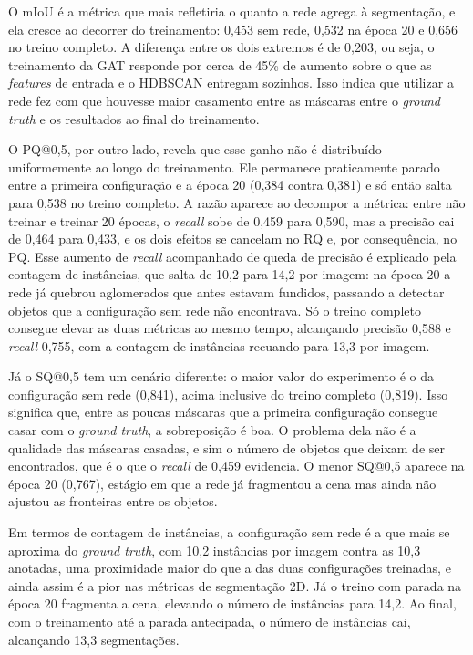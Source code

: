 O mIoU é a métrica que mais refletiria o quanto a rede agrega à segmentação, e ela cresce ao decorrer do treinamento: 0,453 sem rede, 0,532 na época 20 e 0,656 no treino completo. A diferença entre os dois extremos é de 0,203, ou seja, o treinamento da GAT responde por cerca de 45\% de aumento sobre o que as \textit{features} de entrada e o HDBSCAN entregam sozinhos. Isso indica que utilizar a rede fez com que houvesse maior casamento entre as máscaras entre o \textit{ground truth} e os resultados ao final do treinamento.

O PQ@0,5, por outro lado, revela que esse ganho não é distribuído uniformemente ao longo do treinamento. Ele permanece praticamente parado entre a primeira configuração e a época 20 (0,384 contra 0,381) e só então salta para 0,538 no treino completo. A razão aparece ao decompor a métrica: entre não treinar e treinar 20 épocas, o \textit{recall} sobe de 0,459 para 0,590, mas a precisão cai de 0,464 para 0,433, e os dois efeitos se cancelam no RQ e, por consequência, no PQ. Esse aumento de \textit{recall} acompanhado de queda de precisão é explicado pela contagem de instâncias, que salta de 10,2 para 14,2 por imagem: na época 20 a rede já quebrou aglomerados que antes estavam fundidos, passando a detectar objetos que a configuração sem rede não encontrava. Só o treino completo consegue elevar as duas métricas ao mesmo tempo, alcançando precisão 0,588 e \textit{recall} 0,755, com a contagem de instâncias recuando para 13,3 por imagem.

Já o SQ@0,5 tem um cenário diferente: o maior valor do experimento é o da configuração sem rede (0,841), acima inclusive do treino completo (0,819). Isso significa que, entre as poucas máscaras que a primeira configuração consegue casar com o \textit{ground truth}, a sobreposição é boa. O problema dela não é a qualidade das máscaras casadas, e sim o número de objetos que deixam de ser encontrados, que é o que o \textit{recall} de 0,459 evidencia. O menor SQ@0,5 aparece na época 20 (0,767), estágio em que a rede já fragmentou a cena mas ainda não ajustou as fronteiras entre os objetos.


Em termos de contagem de instâncias, a configuração sem rede é a que mais se aproxima do \textit{ground truth}, com 10,2 instâncias por imagem contra as 10,3 anotadas, uma proximidade maior do que a das duas configurações treinadas, e ainda assim é a pior nas métricas de segmentação 2D. Já o treino com parada na época 20 fragmenta a cena, elevando o número de instâncias para 14,2. Ao final, com o treinamento até a parada antecipada, o número de instâncias cai, alcançando 13,3 segmentações.



